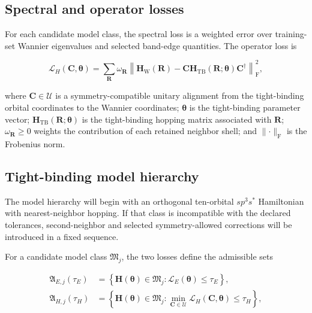 \documentclass[preprint,12pt]{elsarticle}
\begin{document}
\subsection{Spectral and operator losses}
\label{sec:losses}

For each candidate model class, the spectral loss is a weighted error over
training-set Wannier eigenvalues and selected band-edge quantities. The
operator loss is

\begin{equation}
\mathcal{L}_{H}(\bm{C},\bm{\theta})
=
\sum_{\bm{R}}
\omega_{\bm{R}}
\left\|
\bm{H}_{\mathrm{W}}(\bm{R})
-
\bm{C}
\bm{H}_{\mathrm{TB}}(\bm{R};\bm{\theta})
\bm{C}^{\dagger}
\right\|_{\mathrm{F}}^{2},
\label{eq:operator-loss}
\end{equation}

where $\bm{C}\in\mathcal{U}$ is a symmetry-compatible unitary alignment from
the tight-binding orbital coordinates to the Wannier coordinates;
$\bm{\theta}$ is the tight-binding parameter vector;
$\bm{H}_{\mathrm{TB}}(\bm{R};\bm{\theta})$ is the tight-binding hopping
matrix associated with $\bm{R}$; $\omega_{\bm{R}}\geq 0$ weights the
contribution of each retained neighbor shell; and $\lVert\cdot\rVert_{\mathrm F}$
is the Frobenius norm.

\subsection{Tight-binding model hierarchy}
\label{sec:model-hierarchy}

The model hierarchy will begin with an orthogonal ten-orbital
$sp^3s^{\ast}$ Hamiltonian with nearest-neighbor hopping. If that class is
incompatible with the declared tolerances, second-neighbor and selected
symmetry-allowed corrections will be introduced in a fixed sequence.

For a candidate model class $\mathfrak{M}_{j}$, the two losses define the
admissible sets

\begin{align}
\mathfrak{A}_{E,j}(\tau_E)
&=
\left\{
\bm{H}(\bm{\theta})\in\mathfrak{M}_{j}
:
\mathcal{L}_{E}(\bm{\theta})\leq\tau_E
\right\},
\label{eq:spectral-admissible-set}
\\
\mathfrak{A}_{H,j}(\tau_H)
&=
\left\{
\bm{H}(\bm{\theta})\in\mathfrak{M}_{j}
:
\min_{\bm{C}\in\mathcal{U}}
\mathcal{L}_{H}(\bm{C},\bm{\theta})
\leq\tau_H
\right\},
\label{eq:operator-admissible-set}
\end{align}
\end{document}
